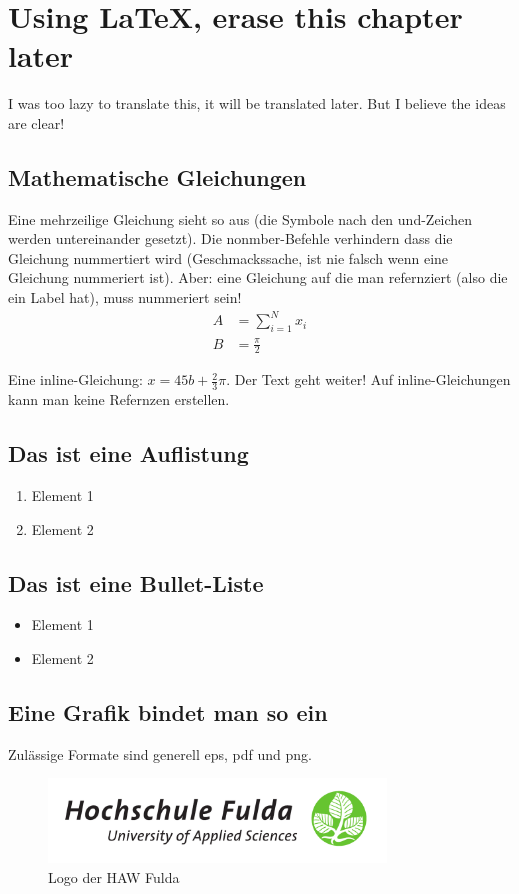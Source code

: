 \documentclass[12pt,oneside]{article}
\begin{document}
\section{Using LaTeX, erase this chapter later}
%
I was too lazy to translate this, it will be translated later. But I believe the ideas are clear!
%
\subsection{Mathematische Gleichungen}
Eine mehrzeilige Gleichung sieht so aus (die Symbole nach den und-Zeichen werden untereinander gesetzt). Die nonmber-Befehle verhindern dass die Gleichung nummertiert wird (Geschmackssache, ist nie falsch wenn eine Gleichung nummeriert ist). Aber: eine Gleichung auf die man refernziert (also die ein Label hat), muss nummeriert sein!
\begin{align}
    A &= \sum_{i=1}^N x_i \label{eq:1}\nonumber\\
    B &= \frac{\pi}{2}
\end{align}

Eine inline-Gleichung: $x=45b + \frac{2}{3}\pi$. Der Text geht weiter! Auf inline-Gleichungen kann man keine Refernzen erstellen.

\subsection{Das ist eine Auflistung}
\begin{enumerate}
\item Element 1
\item Element 2
\end{enumerate}

\subsection{Das ist eine Bullet-Liste}
\begin{itemize}
\item Element 1
\item Element 2
\end{itemize}


\subsection{Eine Grafik bindet man so ein}
Zulässige Formate sind generell eps, pdf und png.
\begin{figure}[h]
    \centering
    \includegraphics[width=0.8\textwidth]{logo.pdf}
    \caption{Logo der HAW Fulda}
    \label{fig:bildchen}
\end{figure}
\end{document}
